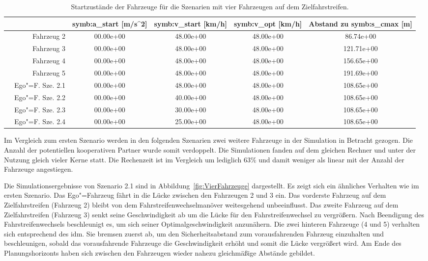 \begin{table}[!htbp]
    \centering
    \begin{tabular}{crSSSS}
        \hline
        & & {\gls{symb:a_start}  [m/s\textasciicircum 2]} & {\gls{symb:v_start} [km/h]} & {\gls{symb:v_opt} [km/h]} & {Abstand zu   \gls{symb:s_cmax} [m]} \\%
        \hline
        & Fahrzeug 2 & 00.00e+00 & 48.00e+00 & 48.00e+00 & 86.74e+00\\
        & Fahrzeug 3 & 00.00e+00 & 48.00e+00 & 48.00e+00 & 121.71e+00\\
        & Fahrzeug 4 & 00.00e+00 & 48.00e+00 & 48.00e+00 & 156.65e+00\\
        & Fahrzeug 5 & 00.00e+00 & 48.00e+00 & 48.00e+00 & 191.69e+00\\
         \hline
         & Ego"=F. Sze. 2.1 & 00.00e+00 & 48.00e+00 & 48.00e+00 & 108.65e+00\\
         & Ego"=F. Sze. 2.2 & 00.00e+00 & 40.00e+00 & 48.00e+00 & 108.65e+00\\
         & Ego"=F. Sze. 2.3 & 00.00e+00 & 30.00e+00 & 48.00e+00 & 108.65e+00\\
         & Ego"=F. Sze. 2.4 & 00.00e+00 & 25.00e+00 & 48.00e+00 & 108.65e+00\\
          \hline
    \end{tabular}
    \caption[Startzust\"ande Szenarien 2]{Startzust\"ande der Fahrzeuge f\"ur die Szenarien mit vier Fahrzeugen auf dem Zielfahrstreifen.
    }\label{tab:StartS2}
\end{table}

Im Vergleich zum ersten Szenario werden in den folgenden Szenarien zwei weitere Fahrzeuge in der Simulation in Betracht gezogen.
Die Anzahl der potentiellen kooperativen Partner wurde somit verdoppelt.
Die Simulationen fanden auf dem gleichen Rechner und unter der Nutzung gleich vieler Kerne statt.
Die Rechenzeit ist im Vergleich um lediglich 63\% und damit weniger als linear mit der Anzahl der Fahrzeuge angestiegen.

Die Simulationsergebnisse von Szenario 2.1 sind in Abbildung~\ref{fig:VierFahrzeuge} dargestellt.
Es zeigt sich ein \"ahnliches Verhalten wie im ersten Szenario.
Das Ego"=Fahrzeug f\"ahrt in die L\"ucke zwischen den Fahrzeugen 2 und 3 ein.
Das vorderste Fahrzeug auf dem Zielfahrstreifen (Fahrzeug 2) bleibt von dem Fahrstreifenwechselman\"over weitesgehend unbeeinflusst.
Das zweite Fahrzeug auf dem Zielfahrstreifen (Fahrzeug 3) senkt seine Geschwindigkeit ab um die L\"ucke f\"ur den Fahrstreifenwechsel zu vergr\"o{\ss}ern.
Nach Beendigung des Fahrstreifenwechsels beschleunigt es, um sich seiner Optimalgeschwindigkeit anzun\"ahern.
Die zwei hinteren Fahrzeuge (4 und 5) verhalten sich entsprechend des \gls{idm}.
Sie bremsen zuerst ab, um den Sicherheitsabstand zum vorausfahrenden Fahrzeug einzuhalten und beschleunigen, sobald das vorausfahrende Fahrzeuge die Geschwindigkeit erh\"oht und somit die L\"ucke vergr\"o{\ss}ert wird.
Am Ende des Planungshorizonts haben sich zwischen den Fahrzeugen wieder nahezu gleichm\"a{\ss}ige Abst\"ande gebildet.


